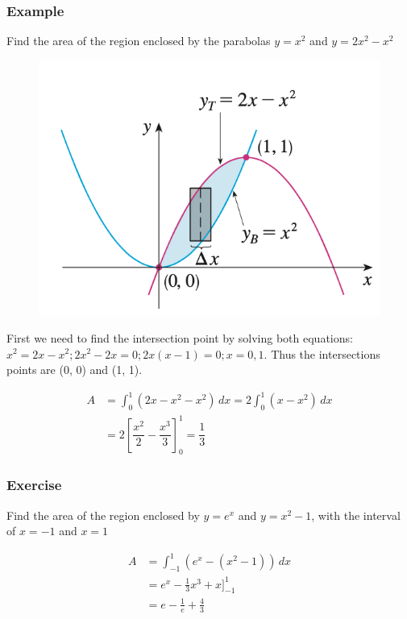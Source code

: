 \documentclass[t]{beamer}
\theoremstyle{plain}
\theoremstyle{definition}
\begin{document}
\begin{frame}

\frametitle{Example}
\footnotesize
Find the area of the region enclosed by the parabolas $ y = x^2$ and $y= 2x^2 - x^2$

\vspace{-0.5em}
\begin{figure}[t]
\begin{center}
\includegraphics[scale=0.5]{fig/area2}
\end{center}
\end{figure}

\vspace{-1em}

First we need to find the intersection point by solving both equations: $x^2 = 2x - x^2; 2x^2 - 2x = 0; 2x(x-1) = 0; x = 0, 1$.   Thus the intersections points are (0, 0) and (1, 1).

\begin{align*}
A &= \int_{0}^{1} (2x - x^2 - x^2) \, dx = 2  \int_{0}^{1} (x - x^2) \, dx \\
   &= 2\left[ \dfrac{x^2}{2} - \dfrac{x^3}{3}\right]_{0}^{1}= \dfrac{1}{3}
\end{align*}

\end{frame}

\begin{frame}

\frametitle{Exercise}

Find the area of the region enclosed by $y= e^x$ and $y = x^2 - 1$,  with the interval of $x = -1$ and $x=1$ \pause

\begin{align*}
A &= \int_{-1}^{1} (e^x - (x^2 - 1)) \, dx \\
   &= e^x - \frac{1}{3}x^3 + x \big]_{-1}^{1}\\
   &= e - \frac{1}{e} + \frac{4}{3}
\end{align*}

\end{frame}
\end{document}
